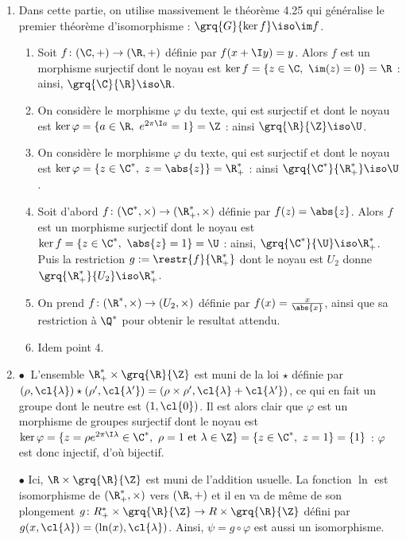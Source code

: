 
\begin{enumerate}
 \item Dans cette partie, on utilise massivement le théorème 4.25 qui généralise le premier théorème d'isomorphisme : $\grq{G}{\ker f} \iso \im f$.
 \begin{enumerate}[1)]
  \item Soit $f\colon (\C,+)\to (\R,+)$ définie par $f(x+\I y) = y$. Alors $f$ est un morphisme surjectif dont le noyau est $\ker f =\{z\in\C,~ \im(z) = 0\} = \R$ : ainsi, $\grq{\C}{\R}\iso \R$.
  \item On considère le morphisme $\varphi$ du texte, qui est surjectif et dont le noyau est $\ker \varphi = \{a\in \R,~ e^{2\pi\I a} = 1\} = \Z$ : ainsi $\grq{\R}{\Z} \iso \U$.
  \item On considère le morphisme $\varphi$ du texte, qui est surjectif et dont le noyau est $\ker \varphi = \{z\in \C^*,~ z = \abs{z}\} = \R_+^*$ : ainsi $\grq{\C^*}{\R_+^*} \iso \U$.
  \item Soit d'abord $f\colon (\C^*,\times)\to (\R_+^*,\times)$ définie par $f(z) = \abs{z}$. Alors $f$ est un morphisme surjectif dont le noyau est $\ker f =\{z\in\C^*,~ \abs{z} = 1\} = \U$ : ainsi, $\grq{\C^*}{\U}\iso \R_+^*$. Puis la restriction $g:= \restr{f}{\R_+^*}$ dont le noyau est $U_2$ donne $\grq{\R_+^*}{U_2} \iso \R_+^*$.
  \item On prend $f\colon (\R^*,\times)\to (U_2,\times)$ définie par $f(x) = \frac{x}{\abs{x}}$, ainsi que sa restriction à $\Q^*$ pour obtenir le resultat attendu.
  \item Idem point 4.
 \end{enumerate}
 \item $\bullet~$ L'ensemble $\R_+^*\times \grq{\R}{\Z}$ est muni de la loi $\star$ définie par $(\rho,\cl{\lambda}) \star (\rho ',\cl{\lambda '}) = (\rho\times \rho ', \cl{\lambda}+\cl{\lambda '})$, ce qui en fait un groupe dont le neutre est $(1,\cl{0})$. Il est alors clair que $\varphi$ est un morphisme de groupes surjectif dont le noyau est $\ker \varphi = \{z=\rho e^{2\pi \I \lambda}\in \C^*,~ \rho = 1 \text{ et } \lambda \in \Z \} = \{ z\in \C^*,~ z = 1\} = \{1\}$ : $\varphi$ est donc injectif, d'où bijectif.

  $\bullet$ Ici, $\R\times \grq{\R}{\Z}$ est muni de l'addition usuelle. La fonction $\ln$ est isomorphisme de $(\R_+^*,\times)$ vers $(\R, +)$ et il en va de même de son plongement $g\colon R_+^*\times \grq{\R}{\Z} \to R\times \grq{\R}{\Z}$ défini par $g(x,\cl{\lambda}) = (\ln(x),\cl{\lambda} )$. Ainsi, $\psi = g\circ \varphi$ est aussi un isomorphisme.


\end{enumerate}
